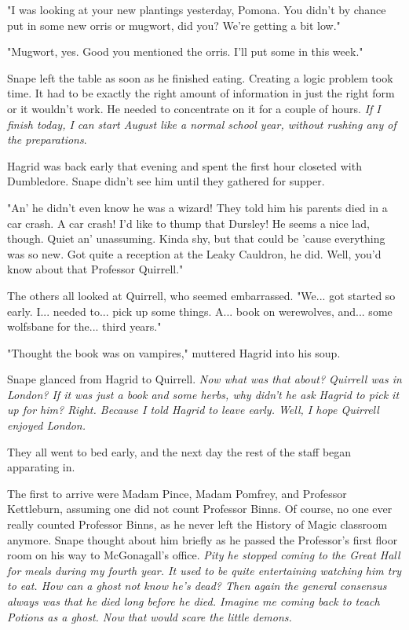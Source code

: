 \documentclass[a4paper,11pt]{article}
\begin{document}
"I was looking at your new plantings yesterday, Pomona. You didn't by chance put in some new orris or mugwort, did you? We're getting a bit low."

"Mugwort, yes. Good you mentioned the orris. I'll put some in this week."

Snape left the table as soon as he finished eating. Creating a logic problem took time. It had to be exactly the right amount of information in just the right form or it wouldn't work. He needed to concentrate on it for a couple of hours. \emph{If I finish today, I can start August like a normal school year, without rushing any of the preparations}.

Hagrid was back early that evening and spent the first hour closeted with Dumbledore. Snape didn't see him until they gathered for supper.

"An' he didn't even know he was a wizard! They told him his parents died in a car crash. A car crash! I'd like to thump that Dursley! He seems a nice lad, though. Quiet an' unassuming. Kinda shy, but that could be 'cause everything was so new. Got quite a reception at the Leaky Cauldron, he did. Well, you'd know about that Professor Quirrell."

The others all looked at Quirrell, who seemed embarrassed. "We... got started so early. I... needed to... pick up some things. A... book on werewolves, and... some wolfsbane for the... third years."

"Thought the book was on vampires," muttered Hagrid into his soup.

Snape glanced from Hagrid to Quirrell. \emph{Now what was that about? Quirrell was in London? If it was just a book and some herbs, why didn't he ask Hagrid to pick it up for him? Right. Because I told Hagrid to leave early. Well, I hope Quirrell enjoyed London.}

They all went to bed early, and the next day the rest of the staff began apparating in.

The first to arrive were Madam Pince, Madam Pomfrey, and Professor Kettleburn, assuming one did not count Professor Binns. Of course, no one ever really counted Professor Binns, as he never left the History of Magic classroom anymore. Snape thought about him briefly as he passed the Professor's first floor room on his way to McGonagall's office. \emph{Pity he stopped coming to the Great Hall for meals during my fourth year. It used to be quite entertaining watching him try to eat. How can a ghost not know he's dead? Then again the general consensus always was that he died long before he died. Imagine me coming back to teach Potions as a ghost. Now that would scare the little demons.}
\end{document}
